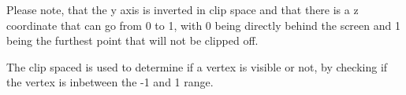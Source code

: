 \documentclass[12pt]{report} \usepackage{preamble}
\begin{document}
Please note, that the y axis is inverted in clip space and that there is a
z coordinate that can go from 0 to 1, with 0 being directly behind the screen
and 1 being the furthest point that will not be clipped off.

The clip spaced is used to determine if a vertex is visible or not, by
checking if the vertex is inbetween the -1 and 1 range. \cite{vulkan-tutorial-shader-modules}

\printbibliography[
	heading=bibintoc, title={Bibliography}
]

\listoffigures
\end{document}
